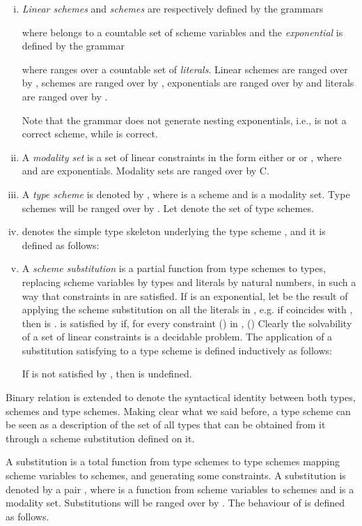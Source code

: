 \begin{defi}\hfill
\begin{enumerate}[i)]
\item\emph{Linear schemes} and \emph{schemes} are
  respectively defined by the grammars

where  belongs to a countable set of scheme variables and the \emph{exponential}   
is defined by the grammar

  where  ranges over a countable set of \emph{literals}.
 Linear schemes are
  ranged over by , schemes are ranged over by , exponentials are ranged over by  and literals are ranged over by .
  
 Note that the grammar does not generate nesting exponentials, i.e.,  is not a correct scheme, while
  is correct. 
\item A \emph{modality set} is a set of linear constraints in the
form either  or  or , where  and  are exponentials. Modality sets are ranged over by C.
\item A \emph{type scheme} is denoted by , where  is a scheme 
and  is
a modality set. Type schemes will be ranged over by . Let  
denote the set of type schemes.
  \item  denotes the simple type skeleton underlying the 
 type scheme , and it is defined as follows:
  
\item A \emph{scheme substitution}  is a partial function from type schemes
  to types, replacing scheme variables by types and literals by
  natural numbers, in such a way that constraints in  are satisfied. If  is an exponential,
  let  be the result of applying the scheme substitution  on all the literals in , e.g. 
 if  coincides with , then  is . 
  is satisfied by  if, for every constraint
  () in ,  ()
Clearly the solvability of a
set of linear constraints is a decidable problem. 
The application of a substitution 
   satisfying  to a type scheme  is defined inductively as follows:
  
   If  is not satisfied by , then  is undefined.
\end{enumerate}
\end{defi}

Binary relation  is extended to denote the syntactical
identity between both types, schemes and type schemes.  Making clear what we
said before, a type scheme can be seen as a description of the set of
all types that can be obtained from it through a scheme
substitution defined on it. 
\medskip

A substitution is a total function from type schemes to type schemes mapping scheme variables 
to schemes, and generating some constraints. 
A substitution is denoted by a pair 
, where  is a function from scheme variables to schemes and  is a modality set. 
Substitutions will be ranged over by . 
The behaviour of  is defined as follows.

